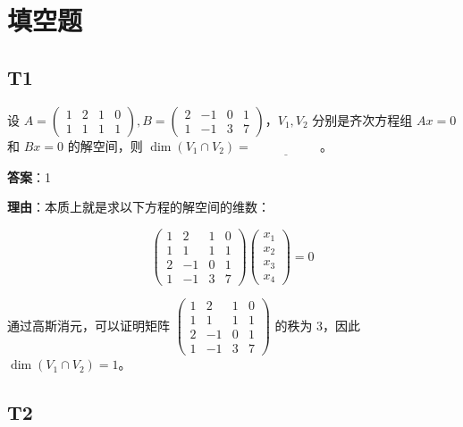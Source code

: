 \documentclass{article}
\begin{document}
\section{填空题}

\subsection{T1}

\par 设 $A=\begin{pmatrix}
	1 & 2 & 1 & 0\\
	1 & 1 & 1 & 1
\end{pmatrix}, B = \begin{pmatrix}
	2 & -1 & 0 & 1\\
	1 & -1 & 3 & 7
\end{pmatrix}$，$V_1, V_2$ 分别是齐次方程组 $Ax=0$ 和 $Bx=0$ 的解空间，则 $\dim(V_1\cap V_2)=\underline{\phantom{empty\_space}}$。

\par \textbf{答案}：1

\par \textbf{理由}：本质上就是求以下方程的解空间的维数：

\begin{equation*}
	\begin{pmatrix}
		1 & 2 & 1 & 0\\
		1 & 1 & 1 & 1\\
		2 & -1 & 0 & 1\\
		1 & -1 & 3 & 7
	\end{pmatrix} \begin{pmatrix}
		x_1\\x_2\\x_3\\x_4
	\end{pmatrix}=0
\end{equation*}

\par 通过高斯消元，可以证明矩阵 $\begin{pmatrix}
	1 & 2 & 1 & 0\\
	1 & 1 & 1 & 1\\
	2 & -1 & 0 & 1\\
	1 & -1 & 3 & 7
\end{pmatrix}$ 的秩为 3，因此 $\dim(V_1\cap V_2)=1$。

\subsection{T2}
\end{document}
